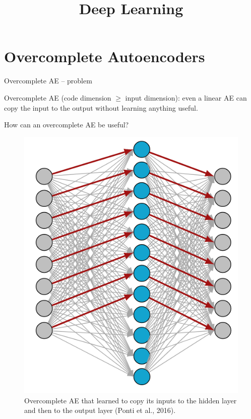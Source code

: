 




\title{Deep Learning}
\date{}


\newcommand{\titlefigure}{plots/denoising_autoencoder.png}
\newcommand{\learninggoals}{
  \item Overcomplete AEs
  \item Sparse AEs
  \item Denoising AEs
  \item Contractive AEs
}





\section{Overcomplete Autoencoders}


\begin{vbframe}{Overcomplete AE -- problem}

  Overcomplete AE (code dimension $\geq$ input dimension): even a linear AE can copy the input to the output without learning anything useful.

  \vspace{0.2cm}

  How can an overcomplete AE be useful?
 
 \vspace*{-0.3cm}
\begin{figure}[h]
    \centering
    \includegraphics[width=0.35\linewidth]{plots/AE_overcomplete2.png}
    \caption{Overcomplete AE that learned to copy its inputs to the hidden layer and then to the output layer (Ponti et al., 2016).} 
\end{figure}
    
    
\end{vbframe}


